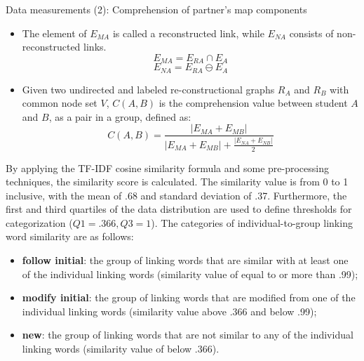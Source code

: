 \begin{frame}[allowframebreaks]{Data measurements (2): Comprehension of partner's map components}
    
    
    \begin{itemize}
        \item The element of $E_{MA}$ is called a reconstructed link, while $E_{NA}$
              consists of non-reconstructed links.
                \begin{equation}
                    E_{MA} = E_{RA} \cap E_A 
                \end{equation}
                \begin{equation}
                    E_{NA} = E_{RA} \ominus E_A
                \end{equation}
        \item Given two undirected and labeled re-constructional graphs $R_A$ and 
              $R_B$ with common node set $V$, 
              $C(A, B)$ is the comprehension value between student 
              $A$ and $B$, as a pair in a group, defined as:
              \begin{equation}
                C(A, B) = \frac{|E_{MA} + E_{MB}|}{|E_{MA} + E_{MB}| + \frac{|E_{NA} + E_{NB}|}{2}} 
              \label{eq:6}
            \end{equation}
    \end{itemize}
    
    
By applying the TF-IDF cosine similarity formula \cite{Qian2004SimilarityQueries}
and some pre-processing techniques, the similarity score is calculated.
The similarity value is from 0 to 1 inclusive, with
the mean of .68 and standard deviation of .37. 
Furthermore, the first and third quartiles  
of the data distribution are used to define thresholds for categorization
($Q1 = .366, Q3 = 1$). The categories of individual-to-group linking word 
similarity are as follows:
\begin{itemize}
\item \textbf{follow initial}: the group of linking words that are similar with 
at least one of the individual linking words (similarity value of equal to or more than .99);
\item \textbf{modify initial}: the group of linking words that are modified from one 
of the individual linking words (similarity value above .366 and below .99);
\item \textbf{new}: the group of linking words that are 
not similar to any of the individual linking words 
(similarity value of below .366).
\end{itemize}


\end{frame}

